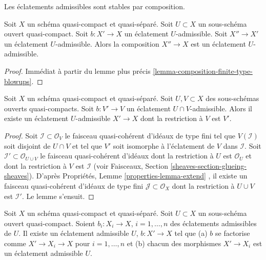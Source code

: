 \begin{lemma}
\label{lemma-composition-admissible-blowups}
\begin{slogan}
Les éclatements admissibles sont stables par composition.
\end{slogan}
Soit  $X$  un schéma quasi-compact et quasi-séparé. Soit  $U \subset X$  un
sous-schéma ouvert quasi-compact. Soit  $b : X' \to X$  un éclatement
 $U$-admissible. Soit  $X'' \to X'$  un éclatement  $U$-admissible.
Alors la composition  $X'' \to X$  est un éclatement  $U$-admissible.
\end{lemma}

\begin{proof}
Immédiat à partir du lemme plus précis  \ref{lemma-composition-finite-type-blowups}.
\end{proof}

\begin{lemma}
\label{lemma-extend-admissible-blowups}
Soit  $X$  un schéma quasi-compact et quasi-séparé. Soit  $U, V \subset X$  des
sous-schémas ouverts quasi-compacts. Soit  $b : V' \to V$  un éclatement
 $U \cap V$-admissible. Alors il existe un éclatement  $U$-admissible
 $X' \to X$  dont la restriction à  $V$  est  $V'$.
\end{lemma}

\begin{proof}
Soit  $\mathcal{I} \subset \mathcal{O}_V$  le faisceau quasi-cohérent d'idéaux de type fini tel que
 $V(\mathcal{I})$  soit disjoint de  $U \cap V$  et tel que  $V'$  soit isomorphe
à l'éclatement de  $V$  dans  $\mathcal{I}$. Soit  $\mathcal{I}' \subset \mathcal{O}_{U \cup V}$  le faisceau
quasi-cohérent d'idéaux dont la restriction à  $U$  est  $\mathcal{O}_U$  et
dont la restriction à  $V$  est  $\mathcal{I}$  (voir Faisceaux, Section
 \ref{sheaves-section-glueing-sheaves}). D'après Propriétés, Lemme  \ref{properties-lemma-extend} , il existe un faisceau
quasi-cohérent d'idéaux de type fini  $\mathcal{J} \subset \mathcal{O}_X$  dont la restriction à
 $U \cup V$  est  $\mathcal{I}'$. Le lemme s'ensuit.
\end{proof}

\begin{lemma}
\label{lemma-dominate-admissible-blowups}
Soit  $X$  un schéma quasi-compact et quasi-séparé. Soit  $U \subset X$  un
sous-schéma ouvert quasi-compact. Soient  $b_i : X_i \to X$,  $i = 1, \ldots, n$  des
éclatements admissibles de  $U$. Il existe un éclatement admissible
 $U$,  $b : X' \to X$  tel que (a)  $b$  se factorise comme
 $X' \to X_i \to X$  pour  $i = 1, \ldots, n$  et (b) chacun des morphismes  $X' \to X_i$  est un
éclatement admissible  $U$.
\end{lemma}

